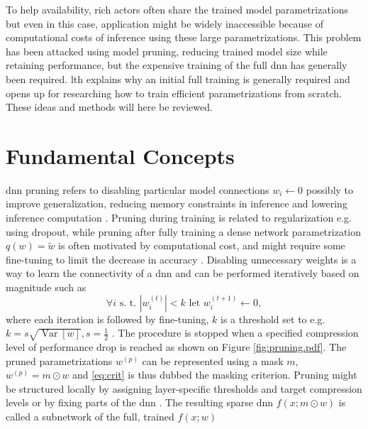 \documentclass[12pt,fleqn,twocolumn]{article}
\newcommand{\half}{\ensuremath{\frac{1}{2}}}
\begin{document}
To help availability, rich actors often share the trained model parametrizations but even in this case, application might be widely inaccessible because of computational costs of inference using these large parametrizations.
This problem has been attacked using model pruning, reducing trained model size while retaining performance, but the expensive training of the full \acrshort{dnn} has generally been required.
\acrshort{lth} explains why an initial full training is generally required and opens up for researching how to train efficient parametrizations from scratch.
These ideas and methods will here be reviewed.

\section*{Fundamental Concepts}%
\acrshort{dnn} pruning refers to disabling particular model connections $w_i \leftarrow 0$ possibly to improve generalization, reducing memory constraints in inference and lowering inference computation \cite{LeCun1989OptimalBD}.
Pruning during training is related to regularization e.g. using dropout, while pruning after fully training a dense network parametrization $q(w)=\tilde w$ is often motivated by computational cost, and might require some fine-tuning to limit the decrease in accuracy \cite{lange2020lth}.
Disabling unnecessary weights is a way to learn the connectivity of a \acrshort{dnn} and can be performed iteratively based on magnitude such as 
\begin{equation}\label{eq:crit}
    \forall i \text{ s. t. } |w_i^{(t)}|<k \text{ let } w_i^{(t+1)} \leftarrow 0,
\end{equation}
where each iteration is followed by fine-tuning, $k$ is a threshold set to e.g. $k=s\sqrt{\operatorname{Var}[w]}, s=\half$ \cite{han2015learning, nzmora2019distiller}. 
The procedure is stopped when a specified compression level of performance drop is reached \cite{han2015learning} as shown on Figure \ref{fig:pruning.pdf}.
The pruned parametrizations $w^{(p)}$ can be represented using a mask $m$, $w^{(p)} = m \odot w$ and \eqref{eq:crit} is thus dubbed the masking criterion.
Pruning might be structured locally by assigning layer-specific thresholds and target compression levels or by fixing parts of the \acrshort{dnn} \cite{han2015learning}.
The resulting sparse \acrshort{dnn} $f(x;m\odot w)$ is called a subnetwork of the full, trained $f(x;w)$
\end{document}
